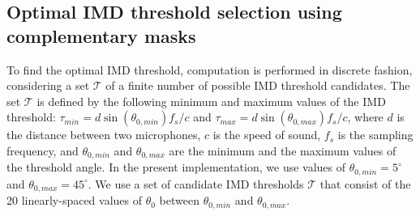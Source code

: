 \documentclass{article}
\begin{document}
\subsection{Optimal IMD threshold selection using complementary masks}
\label{sec:optimalIMDthresholdSelection}
%
%
To find   the optimal IMD threshold, computation is performed in discrete fashion, considering  a set  $\mathcal{T}$ of a finite number  of possible IMD threshold candidates. The set $\mathcal{T}$ is defined by the following minimum and maximum values
of the IMD threshold: $\tau_{min}  =   d \sin(\theta_{0, min})f_s/c$ and $\tau_{max}  =  d \sin(\theta_{0, max}) f_s / c$, where $d$ is the distance between two microphones, $c$ is the speed of sound,   $f_s$ is the sampling frequency, and  
$\theta_{0, min}$ and $\theta_{0, max}$  are the minimum and the maximum values
of the threshold angle. In the present implementation, we use  values of $\theta_{0, min} = 5 ^{\circ}$ and 
$\theta_{0, max} = 45 ^{\circ}$. We use a set of candidate IMD thresholds $\mathcal{T}$ that consist of the 20   linearly-spaced values of $\theta_{0}$ between $\theta_{0, min}$ and $\theta_{0, max}$.
%
%
\end{document}

